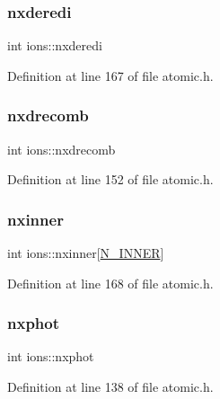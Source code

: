 \mbox{\label{structions_a21e7ca2eb457bdcd6e30c8f184f56bc4}} 
\subsubsection{\texorpdfstring{nxderedi}{nxderedi}}
{\footnotesize\ttfamily int ions\+::nxderedi}



Definition at line 167 of file atomic.\+h.

\mbox{\label{structions_a0fcf00a6c9d8d657dab3a74cdba9b32f}} 
\subsubsection{\texorpdfstring{nxdrecomb}{nxdrecomb}}
{\footnotesize\ttfamily int ions\+::nxdrecomb}



Definition at line 152 of file atomic.\+h.

\mbox{\label{structions_a2feb335d9e75a0effd5d2af9d83d6e72}} 
\subsubsection{\texorpdfstring{nxinner}{nxinner}}
{\footnotesize\ttfamily int ions\+::nxinner\mbox{[}\hyperlink{atomic_8h_a075fa3e554e15e462b864cd9b40538f3}{N\+\_\+\+I\+N\+N\+ER}\mbox{]}}



Definition at line 168 of file atomic.\+h.

\mbox{\label{structions_a2eaa82b1ac409b1606fffb05e1a02e8a}} 
\subsubsection{\texorpdfstring{nxphot}{nxphot}}
{\footnotesize\ttfamily int ions\+::nxphot}



Definition at line 138 of file atomic.\+h.

\mbox{\label{structions_a40ae093784ce3b98625c98cf3e75540c}} 
